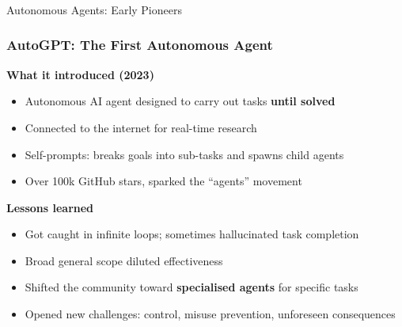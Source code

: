 \begin{frame}[fragile]\frametitle{}
\begin{center}
{\Large Autonomous Agents: Early Pioneers}
\end{center}
\end{frame}

\begin{frame}[fragile]
\frametitle{AutoGPT: The First Autonomous Agent}

\textbf{What it introduced (2023)}
\begin{itemize}
    \item Autonomous AI agent designed to carry out tasks \textbf{until solved}
    \item Connected to the internet for real-time research
    \item Self-prompts: breaks goals into sub-tasks and spawns child agents
    \item Over 100k GitHub stars, sparked the ``agents'' movement
\end{itemize}

\textbf{Lessons learned}
\begin{itemize}
    \item Got caught in infinite loops; sometimes hallucinated task completion
    \item Broad general scope diluted effectiveness
    \item Shifted the community toward \textbf{specialised agents} for specific tasks
    \item Opened new challenges: control, misuse prevention, unforeseen consequences
\end{itemize}

\end{frame}

